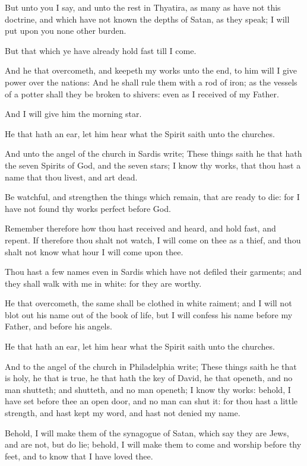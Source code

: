 \Verse But unto you I say, and unto the rest in Thyatira, as many as have not this doctrine, and which have not known the depths of Satan, as they speak; I will put upon you none other burden.

\Verse But that which ye have already hold fast till I come.

\Verse And he that overcometh, and keepeth my works unto the end, to him will I give power over the nations: \Verse And he shall rule them with a rod of iron; as the vessels of a potter shall they be broken to shivers: even as I received of my Father.

\Verse And I will give him the morning star.

\Verse He that hath an ear, let him hear what the Spirit saith unto the churches.

\Chapter
\Verse And unto the angel of the church in Sardis write; These things saith he that hath the seven Spirits of God, and the seven stars; I know thy works, that thou hast a name that thou livest, and art dead.

\Verse Be watchful, and strengthen the things which remain, that are ready to die: for I have not found thy works perfect before God.

\Verse Remember therefore how thou hast received and heard, and hold fast, and repent. If therefore thou shalt not watch, I will come on thee as a thief, and thou shalt not know what hour I will come upon thee.

\Verse Thou hast a few names even in Sardis which have not defiled their garments; and they shall walk with me in white: for they are worthy.

\Verse He that overcometh, the same shall be clothed in white raiment; and I will not blot out his name out of the book of life, but I will confess his name before my Father, and before his angels.

\Verse He that hath an ear, let him hear what the Spirit saith unto the churches.

\Verse And to the angel of the church in Philadelphia write; These things saith he that is holy, he that is true, he that hath the key of David, he that openeth, and no man shutteth; and shutteth, and no man openeth; \Verse I know thy works: behold, I have set before thee an open door, and no man can shut it: for thou hast a little strength, and hast kept my word, and hast not denied my name.

\Verse Behold, I will make them of the synagogue of Satan, which say they are Jews, and are not, but do lie; behold, I will make them to come and worship before thy feet, and to know that I have loved thee.

